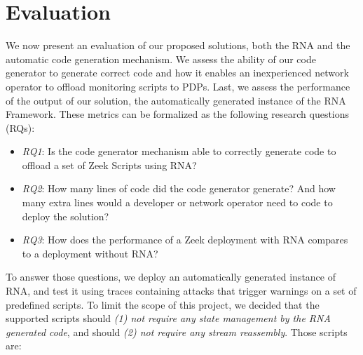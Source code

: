 % 
% 



\section{Evaluation}
\label{sec:evaluation:evaluation}

We now present an evaluation of our proposed solutions, both the RNA and the automatic code generation mechanism. We assess the ability of our code generator to generate correct code and how it enables an inexperienced network operator to offload monitoring scripts to PDPs. Last, we assess the performance of the output of our solution, the automatically generated instance of the RNA Framework. These metrics can be formalized as the following research questions (RQs):

\begin{itemize}
    \item \textit{RQ1}: Is the code generator mechanism able to correctly generate code to offload a set of Zeek Scripts using RNA?
    
    \item \textit{RQ2}: How many lines of code did the code generator generate? And how many extra lines would a developer or network operator need to code to deploy the solution?
    
    \item \textit{RQ3}: How does the performance of a Zeek deployment with RNA compares to a deployment without RNA?
\end{itemize}

To answer those questions, we deploy an automatically generated instance of RNA, and test it using traces containing attacks that trigger warnings on a set of predefined scripts. To limit the scope of this project, we decided that the supported scripts should \textit{(1) not require any state management by the RNA generated code}, and should \textit{(2) not require any stream reassembly}. Those scripts are:

